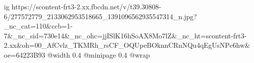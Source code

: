  
 
 
 
 

\ifcmt
  ig https://scontent-frt3-2.xx.fbcdn.net/v/t39.30808-6/277572779_2133062953518665_1391096562935547314_n.jpg?_nc_cat=110&ccb=1-7&_nc_sid=730e14&_nc_ohc=jjISlK16hSoAX8Mo7lZ&_nc_ht=scontent-frt3-2.xx&oh=00_AfCvlz_TKMRh_rsCF_OQUpeBOknnCRnNQu4qEgUsNPc6hw&oe=64223B93
  @width 0.4
  @minipage 0.4
  @wrap \parpic[r]
\fi
